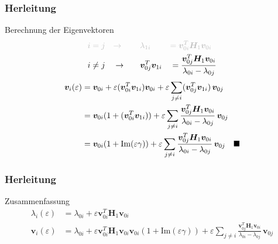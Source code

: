\documentclass[ngerman, aspectratio=169]{beamer}
\newcommand*{\QED}{\hfill\ensuremath{\blacksquare}}%
\newcommand*{\GR}{\textcolor{lightgray}}
\begin{document}
	\begin{frame}
        \frametitle{Herleitung}

		\begin{block}{Berechnung der Eigenvektoren}
			\begin{alignat*}{3}
				\GR{i = j \quad} & \GR{\rightarrow  \quad} && \GR{\lambda_{1i}} && \GR{= \bm v_{0i}^T \bm H_1 \bm v_{0i}} \\
				i \neq j \quad & \rightarrow \quad && \bm v_{0j}^T \bm v_{1i}&& = \frac{\bm v_{0j}^T \bm H_1 \bm v_{0i}}{\lambda_{0i} - \lambda_{0j}}
			\end{alignat*}
			\begin{align*}
				\bm v_i(\varepsilon)
				&=
				\bm v_{0i} + \varepsilon ( \bm v_{0i}^T \bm v_{1i}) \bm v_{0i} + \varepsilon \sum_{j \neq i} (\bm v_{0j}^T \bm v_{1i}) \, \bm v_{0j} \\
				&=
				\bm v_{0i} ( 1 + (\bm v_{0i}^T \bm v_{1i}) ) + \varepsilon \sum_{j \neq i}
				\frac{\bm v_{0j}^T \bm H_1 \bm v_{0i}}{\lambda_{0i} - \lambda_{0j}}
				\, \bm v_{0j} \\
				&=
				\bm v_{0i} ( 1 + \mathrm{Im}(\varepsilon \gamma) ) + \varepsilon \sum_{j \neq i}
				\frac{\bm v_{0j}^T \bm H_1 \bm v_{0i}}{\lambda_{0i} - \lambda_{0j}}
				\, \bm v_{0j}
				\quad
				\QED
			\end{align*}
        \end{block}
	\end{frame}

	\begin{frame}
        \frametitle{Herleitung}

		\begin{block}{Zusammenfassung}
			\begin{align*}
				\lambda_i(\varepsilon)
				&=
				\lambda_{0i} + \varepsilon \bm v_{0i}^T \bm H_1 \bm v_{0i}\\
				\bm v_i(\varepsilon)
				&=
				\lambda_{0i} + \varepsilon \bm v_{0i}^T \bm H_1 \bm v_{0i}
				\bm v_{0i} ( 1 + \mathrm{Im}(\varepsilon \gamma) ) + \varepsilon \sum_{j \neq i}
				\frac{\bm v_{0j}^T \bm H_1 \bm v_{0i}}{\lambda_{0i} - \lambda_{0j}}
				\, \bm v_{0j}
			\end{align*}
        \end{block}
	\end{frame}
\end{document}
